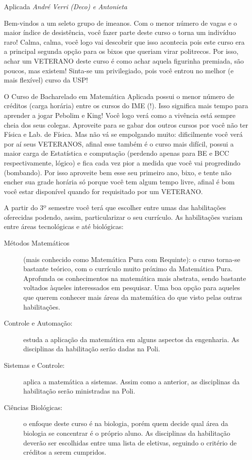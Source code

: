 \begin{subsecao}{Aplicada}
{\em André Verri (Deco) e Antonieta}

Bem-vindos a um seleto grupo de imeanos. Com o menor número de vagas e o
maior índice de desistência, você fazer parte deste curso o torna um indivíduo
raro! Calma, calma, você logo vai descobrir que isso acontecia pois este curso
era a principal segunda opção para os bixos que queriam virar politrecos. Por
isso, achar um VETERANO deste curso é como achar aquela figurinha premiada, são
poucos, mas existem! Sinta-se um privilegiado, pois você entrou no melhor (e
mais flexível) curso da USP!

O Curso de Bacharelado em Matemática Aplicada possui o menor número de
créditos (carga horária) entre os cursos do IME (!). Isso significa mais tempo
para aprender a jogar Pebolim e King! Você logo verá como a vivência está sempre
 cheia dos seus colegas.
Aproveite para se gabar dos outros cursos por você não ter Física e Lab. de
Física. Mas não vá se empolgando muito: dificilmente você verá por aí seus
VETERANOS, afinal esse também é o curso mais difícil, possui a maior carga de
Estatística e computação (perdendo apenas para BE e BCC respectivamente,
lógico) e fica cada vez pior a medida que você vai progredindo (bombando). Por
isso aproveite bem esse seu primeiro ano, bixo, e tente não encher sua grade
horária só porque você tem algum tempo livre, afinal é bom você estar
disponível quando for requisitado por um VETERANO.

A partir do 3º semestre você terá que escolher entre umas das habilitações
oferecidas podendo, assim, particularizar o seu currículo. As habilitações
variam entre áreas tecnológicas e até biológicas:
\begin{description}
\item [Métodos Matemáticos] (mais conhecido como Matemática Pura com Requinte):
o curso torna-se bastante teórico, com o currículo muito próximo da Matemática
Pura. Aprofunda os conhecimentos na matemática mais abstrata, sendo bastante
voltados àqueles interessados em pesquisar. Uma boa opção para aqueles que
querem conhecer mais áreas da matemática do que visto pelas outras habilitações.
\item [Controle e Automação:] estuda a aplicação da matemática em alguns
aspectos da engenharia. As disciplinas da habilitação serão dadas na Poli.
\item  [Sistemas e Controle:] aplica a matemática a sistemas. Assim como a
anterior, as disciplinas da habilitação serão ministradas na Poli.
\item  [Ciências Biológicas:] o enfoque deste curso é na biologia, porém quem
decide qual área da biologia se concentrar é o próprio aluno. As disciplinas da
habilitação deverão ser escolhidas entre uma lista de eletivas, seguindo o
critério de créditos a serem cumpridos.
\end{description}


\end{subsecao}
